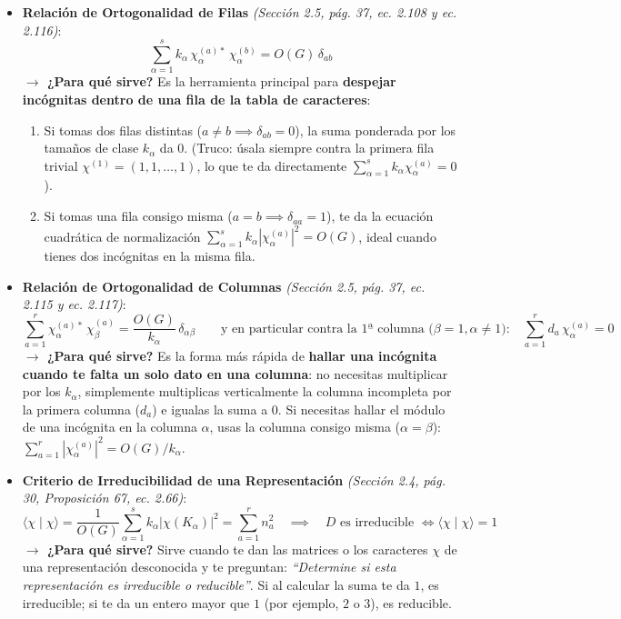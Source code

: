 \documentclass[11pt, a4paper]{article}
\begin{document}
\begin{itemize}
    \item \textbf{Relación de Ortogonalidad de Filas} \textit{(Sección 2.5, pág. 37, ec. 2.108 y ec. 2.116)}:
    \[
    \sum_{\alpha=1}^s k_\alpha \, \chi_\alpha^{(a)*} \, \chi_\alpha^{(b)} = O(G) \, \delta_{ab}
    \]
    \textbf{$\rightarrow$ ¿Para qué sirve?} Es la herramienta principal para \textbf{despejar incógnitas dentro de una fila de la tabla de caracteres}:
    \begin{enumerate}
        \item Si tomas dos filas distintas ($a \neq b \implies \delta_{ab} = 0$), la suma ponderada por los tamaños de clase $k_\alpha$ da $0$. (Truco: úsala siempre contra la primera fila trivial $\chi^{(1)} = (1, 1, \dots, 1)$, lo que te da directamente $\sum_{\alpha=1}^s k_\alpha \chi_\alpha^{(a)} = 0$).
        \item Si tomas una fila consigo misma ($a = b \implies \delta_{aa} = 1$), te da la ecuación cuadrática de normalización $\sum_{\alpha=1}^s k_\alpha |\chi_\alpha^{(a)}|^2 = O(G)$, ideal cuando tienes dos incógnitas en la misma fila.
    \end{enumerate}

    \item \textbf{Relación de Ortogonalidad de Columnas} \textit{(Sección 2.5, pág. 37, ec. 2.115 y ec. 2.117)}:
    \[
    \sum_{a=1}^r \chi_\alpha^{(a)*} \, \chi_\beta^{(a)} = \frac{O(G)}{k_\alpha} \, \delta_{\alpha\beta} \qquad \text{y en particular contra la 1ª columna ($\beta = 1, \alpha \neq 1$):} \quad \sum_{a=1}^r d_a \, \chi_\alpha^{(a)} = 0
    \]
    \textbf{$\rightarrow$ ¿Para qué sirve?} Es la forma más rápida de \textbf{hallar una incógnita cuando te falta un solo dato en una columna}: no necesitas multiplicar por los $k_\alpha$, simplemente multiplicas verticalmente la columna incompleta por la primera columna ($d_a$) e igualas la suma a $0$. Si necesitas hallar el módulo de una incógnita en la columna $\alpha$, usas la columna consigo misma ($\alpha = \beta$): $\sum_{a=1}^r |\chi_\alpha^{(a)}|^2 = O(G)/k_\alpha$.

    \item \textbf{Criterio de Irreducibilidad de una Representación} \textit{(Sección 2.4, pág. 30, Proposición 67, ec. 2.66)}:
    \[
    \langle \chi \mid \chi \rangle = \frac{1}{O(G)} \sum_{\alpha=1}^s k_\alpha \left|\chi(K_\alpha)\right|^2 = \sum_{a=1}^r n_a^2 \quad \implies \quad D \text{ es irreducible } \iff \langle \chi \mid \chi \rangle = 1
    \]
    \textbf{$\rightarrow$ ¿Para qué sirve?} Sirve cuando te dan las matrices o los caracteres $\chi$ de una representación desconocida y te preguntan: \textit{``Determine si esta representación es irreducible o reducible''}. Si al calcular la suma te da $1$, es irreducible; si te da un entero mayor que $1$ (por ejemplo, $2$ o $3$), es reducible.


\end{itemize}
\end{document}
